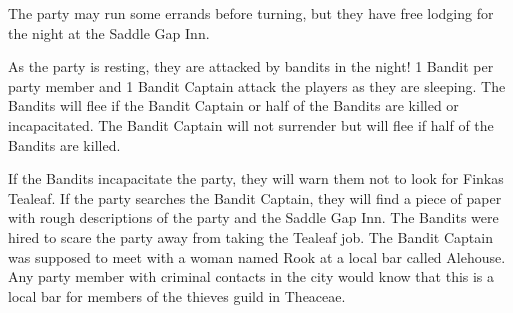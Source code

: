The party may run some errands before turning, but they have free lodging for the night at the Saddle Gap Inn.

As the party is resting, they are attacked by bandits in the night!
1 Bandit per party member and 1 Bandit Captain attack the players as they are sleeping.
The Bandits will flee if the Bandit Captain or half of the Bandits are killed or incapacitated.
The Bandit Captain will not surrender but will flee if half of the Bandits are killed.

If the Bandits incapacitate the party, they will warn them not to look for Finkas Tealeaf.
If the party searches the Bandit Captain, they will find a piece of paper with rough descriptions of the party and the Saddle Gap Inn.
The Bandits were hired to scare the party away from taking the Tealeaf job.
The Bandit Captain was supposed to meet with a woman named Rook at a local bar called Alehouse.
Any party member with criminal contacts in the city would know that this is a local bar for members of the thieves guild in Theaceae.
